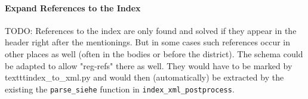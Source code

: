 \paragraph{Expand References to the Index}
TODO: References to the index are only found and solved if they appear in the header right after the mentionings. But in some cases such references occur in other places as well (often in the bodies or before the district). The schema could be adapted to allow "reg-refs" there as well. They would have to be marked by texttt{index\_to\_xml.py} and would then (automatically) be extracted by the existing the \texttt{parse\_siehe} function in \texttt{index\_xml\_postprocess}.